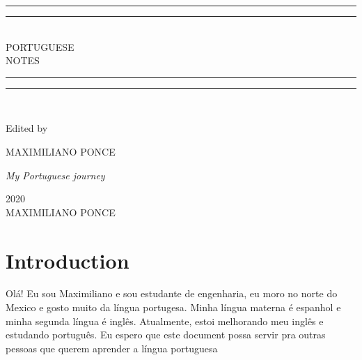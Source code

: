 \documentclass[10pt,a4paper]{article}
\newlength{\drop}
\begin{document}
\begin{titlepage}

\textheight
    \centering
    \vspace*{\baselineskip}
    \rule{\textwidth}{1.6pt}\vspace*{-\baselineskip}\vspace*{2pt}
    \rule{\textwidth}{0.6pt}\\[\baselineskip]
    {\LARGE PORTUGUESE\\[0.2\baselineskip] NOTES}\\[0.2\baselineskip]
    \rule{\textwidth}{0.4pt}\vspace*{-\baselineskip}\vspace{3.2pt}
    \rule{\textwidth}{1.6pt}\\[\baselineskip]
    \scshape

    \vspace*{2\baselineskip}
    Edited by \\[\baselineskip]
    {\Large MAXIMILIANO PONCE\par}
    {\itshape My Portuguese journey \\\par}
    \vfill
    {\scshape 2020} \\
    {\large MAXIMILIANO PONCE}\par

\end{titlepage}

\tableofcontents
\newpage

\section{Introduction}
\indent
Olá! Eu sou Maximiliano e sou estudante de engenharia, eu moro no norte do Mexico e gosto muito da língua portugesa.
Minha língua materna é espanhol e minha segunda língua é inglês. Atualmente, estoi melhorando meu inglês e estudando português.
Eu espero que este document possa servir pra outras pessoas que querem aprender a língua portuguesa
\newpage
\end{document}
